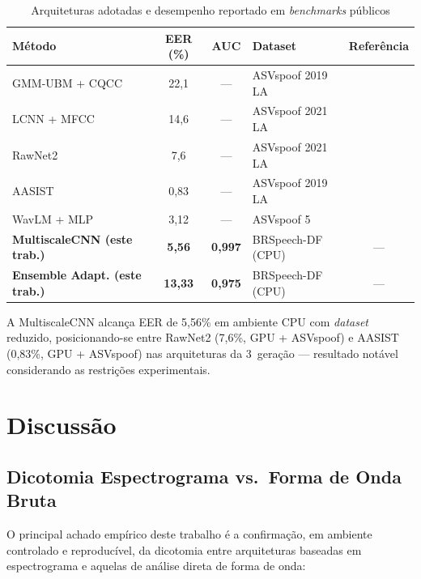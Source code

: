 \documentclass[12pt,a4paper]{article}
\begin{document}
\begin{table}[H]
\centering
\caption{Arquiteturas adotadas e desempenho reportado em
\textit{benchmarks} p\'{u}blicos}
\label{tab:comparacao}
\small
\begin{tabular}{p{3.5cm}ccp{3.5cm}c}
\toprule
\textbf{M\'{e}todo} & \textbf{EER (\%)} & \textbf{AUC} &
\textbf{Dataset} & \textbf{Refer\^{e}ncia} \\
\midrule
GMM-UBM + CQCC   & 22,1  & --- & ASVspoof 2019 LA & \cite{todisco2019asvspoof} \\
LCNN + MFCC      & 14,6  & --- & ASVspoof 2021 LA & \cite{yamagishi2021asvspoof} \\
RawNet2          & 7,6   & --- & ASVspoof 2021 LA & \cite{tak2021rawnet2} \\
AASIST           & 0,83  & --- & ASVspoof 2019 LA & \cite{jung2022aasist} \\
WavLM + MLP      & 3,12  & --- & ASVspoof 5       & \cite{wang2024asvspoof5} \\
\midrule
\textbf{MultiscaleCNN (este trab.)}
  & \textbf{5,56} & \textbf{0,997}
  & BRSpeech-DF (CPU) & --- \\
\textbf{Ensemble Adapt. (este trab.)}
  & \textbf{13,33} & \textbf{0,975}
  & BRSpeech-DF (CPU) & --- \\
\bottomrule
\end{tabular}
\end{table}

A MultiscaleCNN alcan\c{c}a EER de 5,56\% em ambiente CPU com \textit{dataset}
reduzido, posicionando-se entre RawNet2 (7,6\%, GPU + ASVspoof) e AASIST
(0,83\%, GPU + ASVspoof) nas arquiteturas da 3\textordfeminine\ gera\c{c}\~{a}o
--- resultado not\'{a}vel considerando as restri\c{c}\~{o}es experimentais.

\section{Discuss\~{a}o}
\label{sec:discussao}

\subsection{Dicotomia Espectrograma vs.\ Forma de Onda Bruta}

O principal achado emp\'{i}rico deste trabalho \'{e} a confirma\c{c}\~{a}o,
em ambiente controlado e reproducível, da dicotomia entre arquiteturas
baseadas em espectrograma e aquelas de an\'{a}lise direta de forma de onda:
\end{document}
